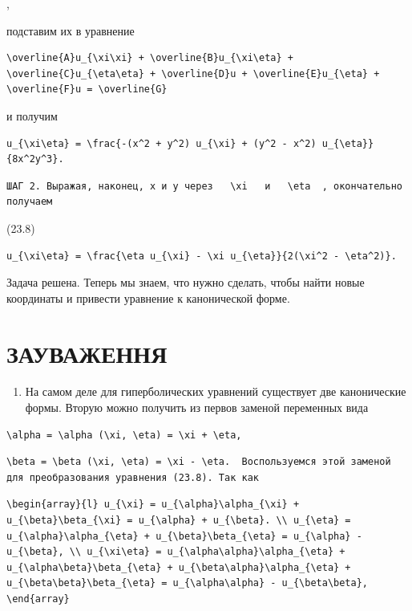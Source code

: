 \documentclass[
  ukrainian,
]{article}
\providecommand{\tightlist}{%
  \setlength{\itemsep}{0pt}\setlength{\parskip}{0pt}}
\begin{document}
,

подставим их в уравнение

\begin{verbatim}
\overline{A}u_{\xi\xi} + \overline{B}u_{\xi\eta} + \overline{C}u_{\eta\eta} + \overline{D}u + \overline{E}u_{\eta} + \overline{F}u = \overline{G}
\end{verbatim}

и получим

\begin{verbatim}
u_{\xi\eta} = \frac{-(x^2 + y^2) u_{\xi} + (y^2 - x^2) u_{\eta}}{8x^2y^3}.
\end{verbatim}

\begin{verbatim}
ШАГ 2. Выражая, наконец, x и y через   \xi   и   \eta  , окончательно получаем
\end{verbatim}

(23.8)

\begin{verbatim}
u_{\xi\eta} = \frac{\eta u_{\xi} - \xi u_{\eta}}{2(\xi^2 - \eta^2)}.
\end{verbatim}

Задача решена. Теперь мы знаем, что нужно сделать, чтобы найти новые
координаты и привести уравнение к канонической форме.

\section{ЗАУВАЖЕННЯ}\label{ux437ux430ux443ux432ux430ux436ux435ux43dux43dux44f}

\begin{enumerate}
\def\labelenumi{\arabic{enumi}.}
\tightlist
\item
  На самом деле для гиперболических уравнений существует две
  канонические формы. Вторую можно получить из первов заменой переменных
  вида
\end{enumerate}

\begin{verbatim}
\alpha = \alpha (\xi, \eta) = \xi + \eta,
\end{verbatim}

\begin{verbatim}
\beta = \beta (\xi, \eta) = \xi - \eta.  Воспользуемся этой заменой для преобразования уравнения (23.8). Так как
\end{verbatim}

\begin{verbatim}
\begin{array}{l} u_{\xi} = u_{\alpha}\alpha_{\xi} + u_{\beta}\beta_{\xi} = u_{\alpha} + u_{\beta}. \\ u_{\eta} = u_{\alpha}\alpha_{\eta} + u_{\beta}\beta_{\eta} = u_{\alpha} - u_{\beta}, \\ u_{\xi\eta} = u_{\alpha\alpha}\alpha_{\eta} + u_{\alpha\beta}\beta_{\eta} + u_{\beta\alpha}\alpha_{\eta} + u_{\beta\beta}\beta_{\eta} = u_{\alpha\alpha} - u_{\beta\beta}, \end{array}
\end{verbatim}
\end{document}
